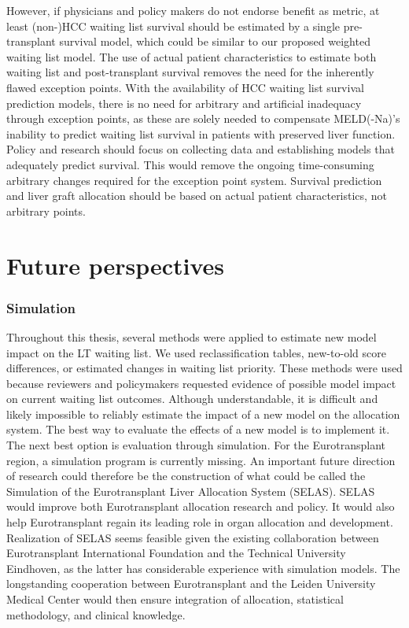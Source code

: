 \documentclass[11pt,english,]{book} %
\begin{document}
However, if physicians and policy makers do not endorse benefit as metric, at least (non-)HCC waiting list survival should be estimated by a single pre-transplant survival model, which could be similar to our proposed weighted waiting list model. The use of actual patient characteristics to estimate both waiting list and post-transplant survival removes the need for the inherently flawed exception points. With the availability of HCC waiting list survival prediction models, there is no need for arbitrary and artificial inadequacy through exception points, as these are solely needed to compensate MELD(-Na)'s inability to predict waiting list survival in patients with preserved liver function. Policy and research should focus on collecting data and establishing models that adequately predict survival. This would remove the ongoing time-consuming arbitrary changes required for the exception point system. Survival prediction and liver graft allocation should be based on actual patient characteristics, not arbitrary points.

\newpage
\pagecolor{black}
\color{white}

\hypertarget{future-perspectives}{%
\chapter{Future perspectives}\label{future-perspectives}}

\newpage
\nopagecolor
\color{black}

\hypertarget{simulation}{%
\subsection*{Simulation}\label{simulation}}

Throughout this thesis, several methods were applied to estimate new model impact on the LT waiting list. We used reclassification tables, new-to-old score differences, or estimated changes in waiting list priority. These methods were used because reviewers and policymakers requested evidence of possible model impact on current waiting list outcomes. Although understandable, it is difficult and likely impossible to reliably estimate the impact of a new model on the allocation system. The best way to evaluate the effects of a new model is to implement it. The next best option is evaluation through simulation. For the Eurotransplant region, a simulation program is currently missing. An important future direction of research could therefore be the construction of what could be called the Simulation of the Eurotransplant Liver Allocation System (SELAS). SELAS would improve both Eurotransplant allocation research and policy. It would also help Eurotransplant regain its leading role in organ allocation and development. Realization of SELAS seems feasible given the existing collaboration between Eurotransplant International Foundation and the Technical University Eindhoven, as the latter has considerable experience with simulation models. The longstanding cooperation between Eurotransplant and the Leiden University Medical Center would then ensure integration of allocation, statistical methodology, and clinical knowledge.
\end{document}
